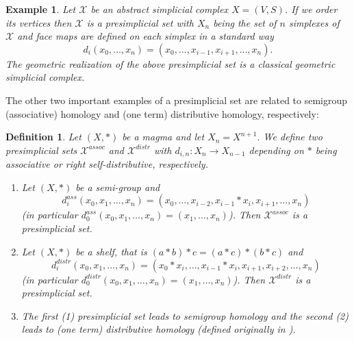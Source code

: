 \documentclass[12pt]{amsart}
\newtheorem{definition}[theorem]{Definition}
\newtheorem{example}[theorem]{Example}
\begin{document}
\begin{example}\label{Example 13.2}
 Let ${\mathcal X}$ be an abstract simplicial complex $X=(V,S)$. If we order its vertices then
${\mathcal X}$ is a presimplicial set with $X_n$ being the set of $n$ simplexes
of ${\mathcal X}$ and face maps are defined on each simplex in a standard way 
\begin{equation*}
d_i(x_0,\ldots,x_n)=
(x_0,\ldots,x_{i-1},x_{i+1},\ldots,x_n).    
\end{equation*}
The geometric realization of the above presimplicial set is a classical geometric simplicial complex.
\end{example}
The other two important examples of a presimplicial set are
related to semigroup (associative) homology and (one term) distributive homology, respectively:
\begin{definition}\label{preass-distr}
Let $(X,*)$ be a magma and let $X_n=X^{n+1}$. We define two presimplicial sets $\mathcal X^{assoc}$ and $\mathcal X^{distr}$ with $d_{i,n}:X_n \to X_{n-1}$ depending on $*$ being associative or right self-distributive, respectively.
\begin{enumerate}
\item[(1)] Let $(X,*)$ be a semi-group and 
\begin{equation*}
d_i^{ass}(x_0,x_1,\ldots,x_n)=(x_0,\ldots,x_{i-2},x_{i-1}*x_i,x_{i+1},\ldots,x_n)
\end{equation*}
(in particular $d_0^{ass}(x_0,x_1,\ldots,x_n)=(x_1,\ldots,x_n)$). Then $\mathcal X^{assoc}$ is a presimplicial set.
\item[(2)] Let $(X,*)$ be a shelf, that is $(a*b)*c=(a*c)*(b*c)$ and
\begin{equation*}
d_i^{distr}(x_0,x_1,\ldots,x_n)=(x_0*x_i,\ldots,x_{i-1}*x_i,x_{i+1},x_{i+2},\ldots,x_n)
\end{equation*}
(in particular $d_0^{distr}(x_0,x_1,\ldots,x_n)=(x_1,\ldots,x_n)$). 
Then $\mathcal X^{distr}$ is a presimplicial set.%
\item[(3)] The first (1) presimplicial set leads to semigroup homology and the second (2) leads to (one term) distributive homology (defined originally in \cite{Prz8}).
\end{enumerate}
\end{definition}
\end{document}
